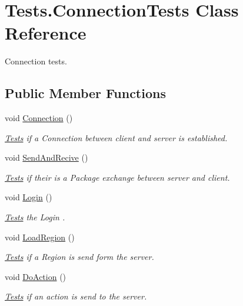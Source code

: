 \hypertarget{classTests_1_1ConnectionTests}{}\section{Tests.\+Connection\+Tests Class Reference}
\label{classTests_1_1ConnectionTests}


Connection tests.  


\subsection*{Public Member Functions}
\begin{DoxyCompactItemize}
\item 
void \hyperlink{classTests_1_1ConnectionTests_abebfc51db68d8e0b1643005e2559253a}{Connection} ()
\begin{DoxyCompactList}\small\item\em \hyperlink{namespaceTests}{Tests} if a Connection between client and server is established. \end{DoxyCompactList}\item 
void \hyperlink{classTests_1_1ConnectionTests_a2a9b782cb23d378d2b909c1e0a6085a3}{Send\+And\+Recive} ()
\begin{DoxyCompactList}\small\item\em \hyperlink{namespaceTests}{Tests} if their is a Package exchange between server and client. \end{DoxyCompactList}\item 
void \hyperlink{classTests_1_1ConnectionTests_af051b3fd85548c9e16d30bf09799392b}{Login} ()
\begin{DoxyCompactList}\small\item\em \hyperlink{namespaceTests}{Tests} the Login . \end{DoxyCompactList}\item 
void \hyperlink{classTests_1_1ConnectionTests_a622d275af03772cb33e6c0a69f2478a0}{Load\+Region} ()
\begin{DoxyCompactList}\small\item\em \hyperlink{namespaceTests}{Tests} if a Region is send form the server. \end{DoxyCompactList}\item 
void \hyperlink{classTests_1_1ConnectionTests_af8c6cbac8d9790a11889182493129ba4}{Do\+Action} ()
\begin{DoxyCompactList}\small\item\em \hyperlink{namespaceTests}{Tests} if an action is send to the server. \end{DoxyCompactList}\end{DoxyCompactItemize}


